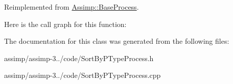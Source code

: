 Reimplemented from \hyperlink{class_assimp_1_1_base_process_aae14d0a8c5918642d4a272b7b74b5d70}{Assimp\+::\+Base\+Process}.



Here is the call graph for this function\+:




The documentation for this class was generated from the following files\+:\begin{DoxyCompactItemize}
\item 
assimp/assimp-\/3../code/Sort\+By\+P\+Type\+Process.\+h\item 
assimp/assimp-\/3../code/Sort\+By\+P\+Type\+Process.\+cpp\end{DoxyCompactItemize}
